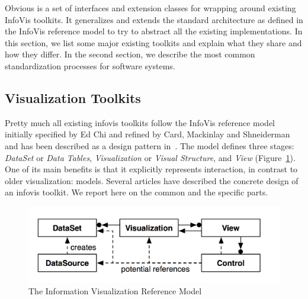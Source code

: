 Obvious is a set of interfaces and extension classes for wrapping
around existing InfoVis toolkits.  It generalizes and extends the
standard architecture as defined in the InfoVis reference model to try
to abstract all the existing implementations.  In this section, we
list some major existing toolkits and explain what they share and how
they differ.  In the second section, we describe the most common
standardization processes for software systems.

\subsection{Visualization Toolkits}

Pretty much all existing infovis toolkits follow the
InfoVis reference model initially specified by Ed Chi and refined by
Card, Mackinlay and Shneiderman~\cite{ReadingsIV,ChiRefModel} and has
been described as a design pattern in~\cite{DesignPatternsIV}.  The
model defines three stages: \emph{DataSet} or \emph{Data Tables},
\emph{Visualization} or \emph{Visual Structure}, and \emph{View}
(Figure~\ref{fig:refmodel}).  One of its main benefits is that it
explicitly represents interaction, in contrast to older visualization:
models.  Several articles have described the concrete design of an
infovis toolkit.  We report here on the common and
the specific parts.

\begin{figure}
\includegraphics[width=\columnwidth]{figures/refmodpat}
\caption{The Information Visualization Reference Model~\cite{DesignPatternsIV}}
\label{fig:refmodel}
\end{figure}


